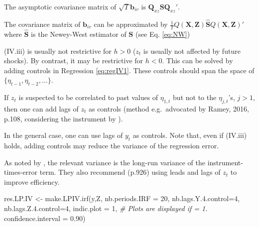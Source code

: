 \documentclass[
]{book}
\newenvironment{Shaded}{\begin{snugshade}}{\end{snugshade}}
\newcommand{\AttributeTok}[1]{\textcolor[rgb]{0.77,0.63,0.00}{#1}}
\newcommand{\CommentTok}[1]{\textcolor[rgb]{0.56,0.35,0.01}{\textit{#1}}}
\newcommand{\DecValTok}[1]{\textcolor[rgb]{0.00,0.00,0.81}{#1}}
\newcommand{\FloatTok}[1]{\textcolor[rgb]{0.00,0.00,0.81}{#1}}
\newcommand{\FunctionTok}[1]{\textcolor[rgb]{0.00,0.00,0.00}{#1}}
\newcommand{\NormalTok}[1]{#1}
\newcommand{\OtherTok}[1]{\textcolor[rgb]{0.56,0.35,0.01}{#1}}
\theoremstyle{definition}
\theoremstyle{definition}
\theoremstyle{definition}
\theoremstyle{definition}
\theoremstyle{remark}
\begin{document}
The asymptotic covariance matrix of \(\sqrt{T}\mathbf{b}_{iv}\) is \(\mathbf{Q}_{xz} \mathbf{S} \mathbf{Q}_{xz}'\).

The covariance matrix of \(\mathbf{b}_{iv}\) can be approximated by \(\frac{1}{T}Q(\mathbf{X},\mathbf{Z})\hat{\mathbf{S}}Q(\mathbf{X},\mathbf{Z})'\) where \(\hat{\mathbf{S}}\) is the Newey-West estimator of \(\mathbf{S}\) (see Eq. \eqref{eq:NW})

(IV.iii) is usually not restrictive for \(h>0\) (\(z_t\) is usually not affected by future shocks). By contrast, it may be restrictive for \(h<0\). This can be solved by adding controls in Regression \eqref{eq:regIV1}. These controls should span the space of \(\{\eta_{t-1},\eta_{t-2},\dots\}\).

If \(z_t\) is suspected to be correlated to past values of \(\eta_{1,t}\) but not to the \(\eta_{j,t}\)'s, \(j>1\), then one can add lags of \(z_t\) as controls (method e.g.~advocated by Ramey, 2016, p.108, considering the instrument by \citet{Gertler_Karadi_2015}).

In the general case, one can use lags of \(y_t\) as controls. Note that, even if (IV.iii) holds, adding controls may reduce the variance of the regression error.

As noted by \citet{Stock_Watson_2018}, the relevant variance is the long-run variance of the instrument-times-error term. They also recommend (p.926) using leads and lags of \(z_t\) to improve efficiency.

\begin{Shaded}
\begin{Highlighting}[]
\NormalTok{res.LP.IV }\OtherTok{\textless{}{-}} \FunctionTok{make.LPIV.irf}\NormalTok{(y,Z,}
                           \AttributeTok{nb.periods.IRF =} \DecValTok{20}\NormalTok{,}
                           \AttributeTok{nb.lags.Y.4.control=}\DecValTok{4}\NormalTok{,}
                           \AttributeTok{nb.lags.Z.4.control=}\DecValTok{4}\NormalTok{,}
                           \AttributeTok{indic.plot =} \DecValTok{1}\NormalTok{, }\CommentTok{\# Plots are displayed if = 1.}
                           \AttributeTok{confidence.interval =} \FloatTok{0.90}\NormalTok{)}
\end{Highlighting}
\end{Shaded}
\end{document}

